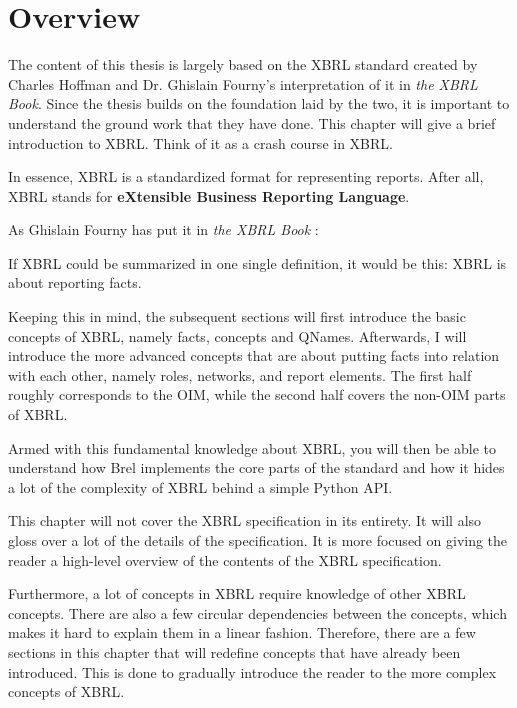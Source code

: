 \section{Overview}

The content of this thesis is largely based on the XBRL standard\cite{xbrl} created by Charles Hoffman and Dr. Ghislain Fourny's interpretation of it in \textit{the XBRL Book}\cite{fourny2023xbrl}.
Since the thesis builds on the foundation laid by the two, it is important to understand the ground work that they have done.
This chapter will give a brief introduction to XBRL.
Think of it as a crash course in XBRL.

In essence, XBRL is a standardized format for representing reports.
After all, XBRL stands for \textbf{eXtensible Business Reporting Language}.\cite{xbrl}

As Ghislain Fourny has put it in \textit{the XBRL Book} \cite{fourny2023xbrl}:
\begin{displayquote}
    If XBRL could be summarized in one single definition, it would be this:
    XBRL is about reporting facts.
\end{displayquote}

Keeping this in mind, the subsequent sections will first introduce the basic concepts of XBRL, namely facts, concepts and QNames.
Afterwards, I will introduce the more advanced concepts that are about putting facts into relation with each other, namely roles, networks, and report elements.
The first half roughly corresponds to the OIM, while the second half covers the non-OIM parts of XBRL.

Armed with this fundamental knowledge about XBRL, 
you will then be able to understand how Brel implements the core parts of the standard and how it hides a lot of the complexity of XBRL behind a simple Python API.

This chapter will not cover the XBRL specification in its entirety.
It will also gloss over a lot of the details of the specification.
It is more focused on giving the reader a high-level overview of the contents of the XBRL specification.

Furthermore, a lot of concepts in XBRL require knowledge of other XBRL concepts.
There are also a few circular dependencies between the concepts, which makes it hard to explain them in a linear fashion.
Therefore, there are a few sections in this chapter that will redefine concepts that have already been introduced.
This is done to gradually introduce the reader to the more complex concepts of XBRL.
